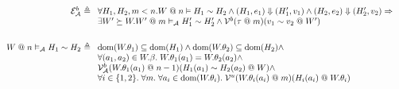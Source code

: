 \documentclass{notes}
\newcommand{\dom}{\textrm{dom}}
\begin{document}
$$\begin{array}{r@{~\triangleq~}l}
  \mathcal{E}^b_{\mathcal{A}} &
                                \begin{array}[t]{l}
                                  \forall H_1, H_2, m < n. W \mathrel{@} n \vDash H_1 \sim H_2 \land (H_1, e_1) \Downarrow (H_1', v_1)  \land (H_2, e_2) \Downarrow (H_2', v_2) \Rightarrow \\
                                  \exists W' \succeq W. W' \mathrel{@} m \vDash_{\mathcal{A}} H_1' \sim H_2' \land \mathcal{V}^b(\tau \mathrel{@} m)(v_1 \sim v_2 \mathrel{@} W')
                                \end{array}\\[3em]
  W \mathrel{@} n \vDash_{\mathcal{A}} H_1 \sim H_2 &
                      \begin{array}[t]{l}
                        \dom(W.\theta_1) \subseteq \dom(H_1) \land \dom(W.\theta_2) \subseteq \dom(H_2) \land \\
                        \forall (a_1, a_2) \in W.\beta.\; W.\theta_1(a_1) = W.\theta_2(a_2) \land\\
                        \mathcal{V}^b_{\mathcal{A}}(W.\theta_1(a_1) \mathrel{@} n - 1)(H_1(a_1) \sim H_2(a_2) \mathrel{@} W) \land\\
                        \forall i \in \{1,2\}.\; \forall m.\; \forall a_i \in \dom(W.\theta_i).\; \mathcal{V}^u(W.\theta_i(a_i) \mathrel{@} m)(H_i(a_i) \mathrel{@} W.\theta_i)
                      \end{array}
\end{array}
$$
\end{document}

